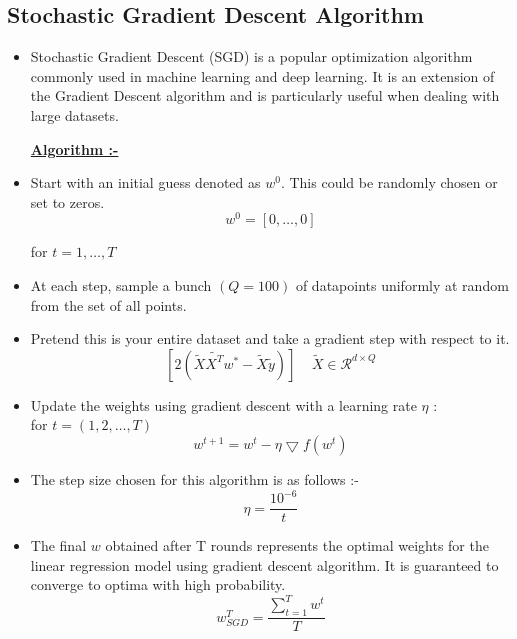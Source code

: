 \documentclass[12pt, a4paper]{article}
\begin{document}
\subsection{Stochastic Gradient Descent Algorithm}
\begin{itemize}
    \item \large Stochastic Gradient Descent (SGD) is a popular optimization algorithm commonly used in machine learning and deep learning. It is an extension of the Gradient Descent algorithm and is particularly useful when dealing with large datasets.
    
    \large \textbf{\underline{Algorithm :-}}
    \item \large Start with an initial guess denoted as $w^0$. This could be randomly chosen or set to zeros.
    \large \[ w^0 = [0,\dots,0]\]

    for $t=1,\dots,T$
    \item \large At each step, sample a bunch $(Q=100)$ of datapoints uniformly at random from the set of all points.
    \item Pretend this  is your entire dataset and take a  gradient step with respect to it.
    \[[2(\tilde{X}\tilde{X^T}w^* - \tilde{X}\tilde{y})]\;\;\;\;\tilde{X}\in\mathcal{R}^{d \times Q} \]
    \item \large Update the weights using gradient descent with a learning rate $\eta$ :\\
    \large for \(t = (1,2,\dots,T)\)
    \large \[ w^{t+1} = w^t - \eta\bigtriangledown f(w^t)\]
    \item \large The step size chosen for this algorithm is as follows :-
    \large \[\eta = \frac{10^{-6}}{{t}}\]
    \item \large The final $w$ obtained after T rounds represents the optimal weights for the linear regression model using gradient descent algorithm. It is guaranteed to converge to optima with high probability.
    \large \[ w^T_{SGD} = \frac{\sum\limits_{t=1}^{T}w^t}{T}\]


\end{itemize}
\end{document}
